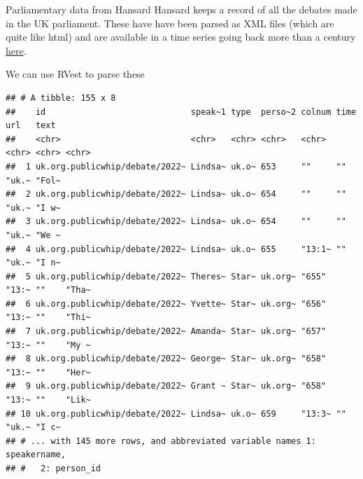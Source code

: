 \documentclass[
  10pt,
  ignorenonframetext,
  aspectratio=169]{beamer}
\newenvironment{Shaded}{\begin{snugshade}}{\end{snugshade}}
\newcommand{\FunctionTok}[1]{\textcolor[rgb]{0.94,0.94,0.56}{#1}}
\newcommand{\NormalTok}[1]{\textcolor[rgb]{0.80,0.80,0.80}{#1}}
\newcommand{\OtherTok}[1]{\textcolor[rgb]{0.94,0.94,0.56}{#1}}
\newcommand{\SpecialCharTok}[1]{\textcolor[rgb]{0.86,0.64,0.64}{#1}}
\newcommand{\StringTok}[1]{\textcolor[rgb]{0.80,0.58,0.58}{#1}}
\begin{document}
\begin{frame}[fragile]{Parliamentary data from Hansard}
\protect\hypertarget{parliamentary-data-from-hansard}{}
Hansard keeps a record of all the debates made in the UK parliament.
These have have been parsed as XML files (which are quite like html) and
are available in a time series going back more than a century
\href{https://parser.theyworkforyou.com/hansard.html}{here}.

We can use RVest to parse these

\scriptsize

\begin{Shaded}
\end{Shaded}

\begin{verbatim}
## # A tibble: 155 x 8
##    id                             speak~1 type  perso~2 colnum time  url   text 
##    <chr>                          <chr>   <chr> <chr>   <chr>  <chr> <chr> <chr>
##  1 uk.org.publicwhip/debate/2022~ Lindsa~ uk.o~ 653     ""     ""    "uk.~ "Fol~
##  2 uk.org.publicwhip/debate/2022~ Lindsa~ uk.o~ 654     ""     ""    "uk.~ "I w~
##  3 uk.org.publicwhip/debate/2022~ Lindsa~ uk.o~ 654     ""     ""    "uk.~ "We ~
##  4 uk.org.publicwhip/debate/2022~ Lindsa~ uk.o~ 655     "13:1~ ""    "uk.~ "I n~
##  5 uk.org.publicwhip/debate/2022~ Theres~ Star~ uk.org~ "655"  "13:~ ""    "Tha~
##  6 uk.org.publicwhip/debate/2022~ Yvette~ Star~ uk.org~ "656"  "13:~ ""    "Thi~
##  7 uk.org.publicwhip/debate/2022~ Amanda~ Star~ uk.org~ "657"  "13:~ ""    "My ~
##  8 uk.org.publicwhip/debate/2022~ George~ Star~ uk.org~ "658"  "13:~ ""    "Her~
##  9 uk.org.publicwhip/debate/2022~ Grant ~ Star~ uk.org~ "658"  "13:~ ""    "Lik~
## 10 uk.org.publicwhip/debate/2022~ Lindsa~ uk.o~ 659     "13:3~ ""    "uk.~ "I c~
## # ... with 145 more rows, and abbreviated variable names 1: speakername,
## #   2: person_id
\end{verbatim}
\end{frame}
\end{document}
